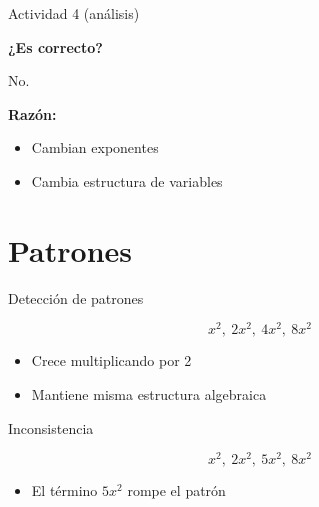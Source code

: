 \begin{frame}{Actividad 4 (análisis)}
	
	
	\pause
	
	\textbf{¿Es correcto?}
	
	\pause
	
	No.
	
	\pause
	
	\textbf{Razón:}
	
	\begin{itemize}
		\item Cambian exponentes
		\item Cambia estructura de variables
	\end{itemize}
	
	\pause
	
	
\end{frame}

\section{Patrones}
\begin{frame}{Detección de patrones}
	
	\[
	x^2,\ 2x^2,\ 4x^2,\ 8x^2
	\]
	
	\pause
	
	\begin{itemize}
		\item Crece multiplicando por 2
		\pause
		\item Mantiene misma estructura algebraica
	\end{itemize}
	
\end{frame}

\begin{frame}{Inconsistencia}
	
	\[
	x^2,\ 2x^2,\ 5x^2,\ 8x^2
	\]
	
	\pause
	
	\begin{itemize}
		\item El término \(5x^2\) rompe el patrón
	\end{itemize}
	
\end{frame}